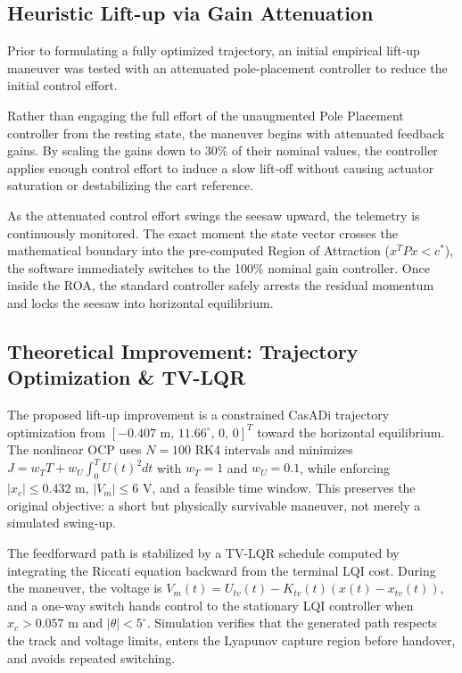 \documentclass[11pt,a4paper]{article}
\begin{document}
\subsection{Heuristic Lift-up via Gain Attenuation}
Prior to formulating a fully optimized trajectory, an initial empirical lift-up maneuver was tested with an attenuated pole-placement controller to reduce the initial control effort.

Rather than engaging the full effort of the unaugmented Pole Placement controller from the resting state, the maneuver begins with attenuated feedback gains. By scaling the gains down to 30\% of their nominal values, the controller applies enough control effort to induce a slow lift-off without causing actuator saturation or destabilizing the cart reference. 

As the attenuated control effort swings the seesaw upward, the telemetry is continuously monitored. The exact moment the state vector crosses the mathematical boundary into the pre-computed Region of Attraction ($x^T P x < c^*$), the software immediately switches to the 100\% nominal gain controller. Once inside the ROA, the standard controller safely arrests the residual momentum and locks the seesaw into horizontal equilibrium.

\subsection{Theoretical Improvement: Trajectory Optimization \& TV-LQR}
The proposed lift-up improvement is a constrained CasADi trajectory optimization from $[-0.407\text{ m},\,11.66^\circ,\,0,\,0]^T$ toward the horizontal equilibrium. The nonlinear OCP uses $N=100$ RK4 intervals and minimizes $J=w_TT+w_U\int_0^T U(t)^2dt$ with $w_T=1$ and $w_U=0.1$, while enforcing $|x_c|\le0.432$ m, $|V_m|\le6$ V, and a feasible time window. This preserves the original objective: a short but physically survivable maneuver, not merely a simulated swing-up.

The feedforward path is stabilized by a TV-LQR schedule computed by integrating the Riccati equation backward from the terminal LQI cost. During the maneuver, the voltage is $V_m(t)=U_{tv}(t)-K_{tv}(t)(x(t)-x_{tv}(t))$, and a one-way switch hands control to the stationary LQI controller when $x_c>0.057$ m and $|\theta|<5^\circ$. Simulation verifies that the generated path respects the track and voltage limits, enters the Lyapunov capture region before handover, and avoids repeated switching.
\end{document}
